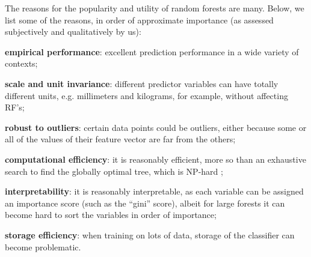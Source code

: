 \documentclass{article} %
\begin{document}
The reasons for the popularity and utility of random forests are many. Below, we list some of the reasons, in order of approximate importance (as assessed subjectively and qualitatively by us):
\begin{compactitem}
\item \textbf{empirical performance}: excellent prediction performance in a wide variety of contexts;
\item \textbf{scale and unit invariance}: different predictor variables can have totally different units, e.g. millimeters and kilograms, for example, without affecting RF's;
\item \textbf{robust to outliers}: certain data points could be outliers, either because some or all of the values of their feature vector are far from the others;
\item \textbf{computational efficiency}: it is reasonably efficient, more so than an exhaustive search to find the globally optimal tree, which is NP-hard \cite{Heath1993};
\item \textbf{interpretability}: it is reasonably interpretable, as each variable can be assigned an importance score (such as the ``gini'' score), albeit for large forests it can become hard to sort the variables in order of importance;
\item \textbf{storage efficiency}: when training on lots of data, storage of the classifier can become problematic.
\end{compactitem}
\end{document}
